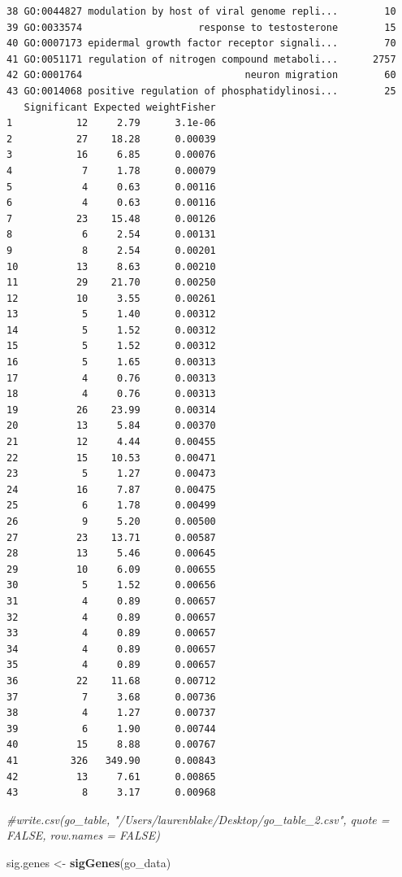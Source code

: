 \documentclass[]{article}
\newenvironment{Shaded}{\begin{snugshade}}{\end{snugshade}}
\newcommand{\KeywordTok}[1]{\textcolor[rgb]{0.13,0.29,0.53}{\textbf{#1}}}
\newcommand{\StringTok}[1]{\textcolor[rgb]{0.31,0.60,0.02}{#1}}
\newcommand{\CommentTok}[1]{\textcolor[rgb]{0.56,0.35,0.01}{\textit{#1}}}
\newcommand{\NormalTok}[1]{#1}
\begin{document}
\begin{verbatim}
38 GO:0044827 modulation by host of viral genome repli...        10
39 GO:0033574                    response to testosterone        15
40 GO:0007173 epidermal growth factor receptor signali...        70
41 GO:0051171 regulation of nitrogen compound metaboli...      2757
42 GO:0001764                            neuron migration        60
43 GO:0014068 positive regulation of phosphatidylinosi...        25
   Significant Expected weightFisher
1           12     2.79      3.1e-06
2           27    18.28      0.00039
3           16     6.85      0.00076
4            7     1.78      0.00079
5            4     0.63      0.00116
6            4     0.63      0.00116
7           23    15.48      0.00126
8            6     2.54      0.00131
9            8     2.54      0.00201
10          13     8.63      0.00210
11          29    21.70      0.00250
12          10     3.55      0.00261
13           5     1.40      0.00312
14           5     1.52      0.00312
15           5     1.52      0.00312
16           5     1.65      0.00313
17           4     0.76      0.00313
18           4     0.76      0.00313
19          26    23.99      0.00314
20          13     5.84      0.00370
21          12     4.44      0.00455
22          15    10.53      0.00471
23           5     1.27      0.00473
24          16     7.87      0.00475
25           6     1.78      0.00499
26           9     5.20      0.00500
27          23    13.71      0.00587
28          13     5.46      0.00645
29          10     6.09      0.00655
30           5     1.52      0.00656
31           4     0.89      0.00657
32           4     0.89      0.00657
33           4     0.89      0.00657
34           4     0.89      0.00657
35           4     0.89      0.00657
36          22    11.68      0.00712
37           7     3.68      0.00736
38           4     1.27      0.00737
39           6     1.90      0.00744
40          15     8.88      0.00767
41         326   349.90      0.00843
42          13     7.61      0.00865
43           8     3.17      0.00968
\end{verbatim}

\begin{Shaded}
\begin{Highlighting}[]
\CommentTok{#write.csv(go_table, "/Users/laurenblake/Desktop/go_table_2.csv", quote = FALSE, row.names = FALSE)}

\NormalTok{sig.genes <-}\StringTok{ }\KeywordTok{sigGenes}\NormalTok{(go_data)}
\end{Highlighting}
\end{Shaded}
\end{document}
